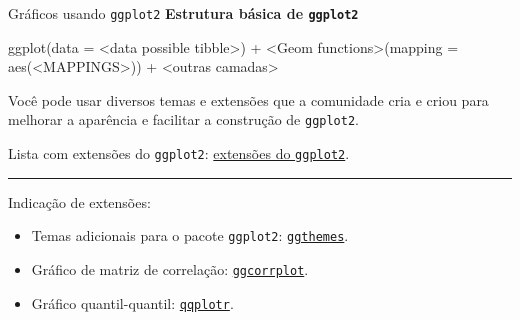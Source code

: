 \documentclass[
  10pt,
  ignorenonframetext,
]{beamer}
\newenvironment{Shaded}{\begin{snugshade}}{\end{snugshade}}
\newcommand{\AttributeTok}[1]{\textcolor[rgb]{0.40,0.45,0.13}{#1}}
\newcommand{\ErrorTok}[1]{\textcolor[rgb]{0.68,0.00,0.00}{#1}}
\newcommand{\FunctionTok}[1]{\textcolor[rgb]{0.28,0.35,0.67}{#1}}
\newcommand{\NormalTok}[1]{\textcolor[rgb]{0.00,0.23,0.31}{#1}}
\newcommand{\SpecialCharTok}[1]{\textcolor[rgb]{0.37,0.37,0.37}{#1}}
\providecommand{\tightlist}{%
  \setlength{\itemsep}{0pt}\setlength{\parskip}{0pt}}\usepackage{longtable,booktabs,array}
\newcommand*{\regrafina}{\rule{\textwidth}{0.5pt}}
\begin{document}
\begin{frame}[fragile]{Gráficos usando \texttt{ggplot2}}
\protect\hypertarget{gruxe1ficos-usando-ggplot2-1}{}
\textbf{Estrutura básica de \texttt{ggplot2}}

\begin{Shaded}
\begin{Highlighting}[]
\FunctionTok{ggplot}\NormalTok{(}\AttributeTok{data =} \SpecialCharTok{\textless{}}\NormalTok{data possible tibble}\SpecialCharTok{\textgreater{}}\NormalTok{) }\SpecialCharTok{+}
  \ErrorTok{\textless{}}\NormalTok{Geom functions}\SpecialCharTok{\textgreater{}}\NormalTok{(}\AttributeTok{mapping =} \FunctionTok{aes}\NormalTok{(}\SpecialCharTok{\textless{}}\NormalTok{MAPPINGS}\SpecialCharTok{\textgreater{}}\NormalTok{)) }\SpecialCharTok{+}
  \ErrorTok{\textless{}}\NormalTok{outras camadas}\SpecialCharTok{\textgreater{}}
\end{Highlighting}
\end{Shaded}

Você pode usar diversos temas e extensões que a comunidade cria e criou
para melhorar a aparência e facilitar a construção de \texttt{ggplot2}.

Lista com extensões do \texttt{ggplot2}:
\href{https://exts.ggplot2.tidyverse.org/gallery/}{extensões do
\texttt{ggplot2}}.

\regrafina

Indicação de extensões:

\begin{itemize}
\tightlist
\item
  Temas adicionais para o pacote \texttt{ggplot2}:
  \href{https://github.com/jrnold/ggthemes}{\texttt{ggthemes}}.
\item
  Gráfico de matriz de correlação:
  \href{https://rpkgs.datanovia.com/ggcorrplot/}{\texttt{ggcorrplot}}.
\item
  Gráfico quantil-quantil:
  \href{https://github.com/aloy/qqplotr}{\texttt{qqplotr}}.
\end{itemize}
\end{frame}
\end{document}
